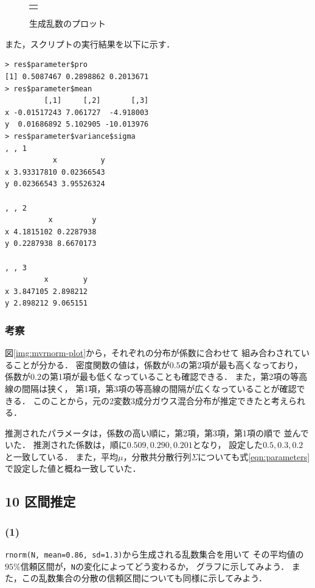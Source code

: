 \documentclass{jsarticle}
\begin{document}
\begin{figure}[b]
\begin{minipage}{0.8\hsize}
\begin{tabular}{c}
\begin{minipage}{0.25\hsize}
				\subcaption{ガウス混合分布}
				\label{img:mvrnorm-density-mix}
			\end{minipage}
		\end{tabular}
		\caption{生成乱数のプロット}
		\label{img:mvrnorm-density}
	\end{minipage}
\end{figure}

また，スクリプトの実行結果を以下に示す．
\begin{verbatim}
> res$parameter$pro
[1] 0.5087467 0.2898862 0.2013671
> res$parameter$mean
         [,1]     [,2]       [,3]
x -0.01517243 7.061727  -4.918003
y  0.01686892 5.102905 -10.013976
> res$parameter$variance$sigma
, , 1
           x          y
x 3.93317810 0.02366543
y 0.02366543 3.95526324

, , 2
          x         y
x 4.1815102 0.2287938
y 0.2287938 8.6670173

, , 3
         x        y
x 3.847105 2.898212
y 2.898212 9.065151
\end{verbatim}

\subsubsection*{考察}
図\ref{img:mvrnorm-plot}から，それぞれの分布が係数に合わせて
組み合わされていることが分かる．
密度関数の値は，係数が$0.5$の第2項が最も高くなっており，
係数が$0.2$の第1項が最も低くなっていることも確認できる．
また，第2項の等高線の間隔は狭く，
第1項，第3項の等高線の間隔が広くなっていることが確認できる．
このことから，元の2変数3成分ガウス混合分布が推定できたと考えられる．

推測されたパラメータは，係数の高い順に，第2項，第3項，第1項の順で
並んでいた．
推測された係数は，順に$0.509, 0.290, 0.201$となり，
設定した$0.5, 0.3, 0.2$と一致している．
また，平均$\mu$，分散共分散行列$\Sigma$についても式\ref{eqn:parameters}
で設定した値と概ね一致していた．

\subsection*{10 区間推定}
\subsubsection*{(1)}
\verb|rnorm(N, mean=0.86, sd=1.3)|から生成される乱数集合を用いて
その平均値の$95\%$信頼区間が，\verb|N|の変化によってどう変わるか，
グラフに示してみよう．
また，この乱数集合の分散の信頼区間についても同様に示してみよう．
\end{document}
